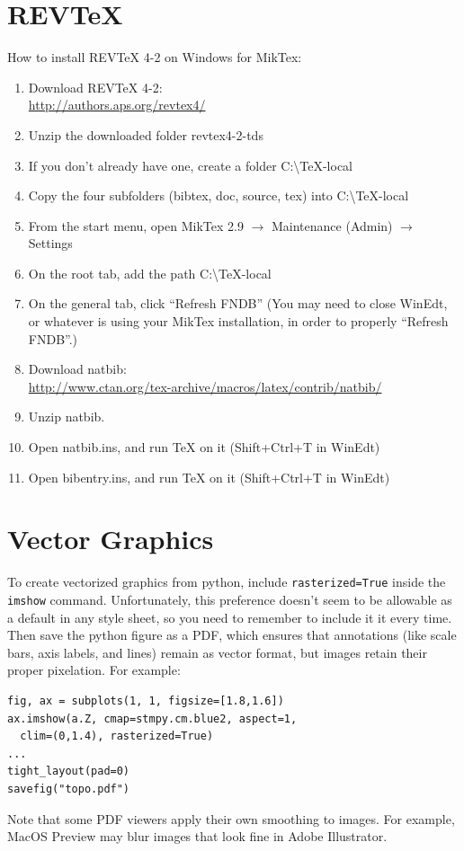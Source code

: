 \documentclass[aps,prb,twocolumn,superscriptaddress,floatfix,longbibliography]{revtex4-2}
\begin{document}
\section{\label{app:REVTeX}REVTeX}

\noindent How to install REVTeX 4-2 on Windows for MikTex:
\begin{enumerate}
\item Download REVTeX 4-2:\\ \url{http://authors.aps.org/revtex4/}
\item Unzip the downloaded folder revtex4-2-tds
\item If you don't already have one, create a folder C:\textbackslash TeX-local
\item Copy the four subfolders (bibtex, doc, source, tex) into C:\textbackslash TeX-local
\item From the start menu, open MikTex 2.9 $\rightarrow$ Maintenance (Admin) $\rightarrow$ Settings
\item On the root tab, add the path C:\textbackslash TeX-local
\item On the general tab, click ``Refresh FNDB''
(You may need to close WinEdt, or whatever is using your MikTex installation, in order to properly ``Refresh FNDB''.)
\item Download natbib:\\
\url{http://www.ctan.org/tex-archive/macros/latex/contrib/natbib/}
\item Unzip natbib.
\item Open natbib.ins, and run TeX on it (Shift+Ctrl+T in WinEdt)
\item Open bibentry.ins, and run TeX on it (Shift+Ctrl+T in WinEdt)
\end{enumerate}

\section{\label{app:vectorfig}Vector Graphics}

To create vectorized graphics from python, include {\tt rasterized=True} inside the {\tt imshow} command. Unfortunately, this preference doesn't seem to be allowable as a default in any style sheet, so you need to remember to include it it every time. Then save the python figure as a PDF, which ensures that annotations (like scale bars, axis labels, and lines) remain as vector format, but images retain their proper pixelation. For example:

\begin{verbatim}
fig, ax = subplots(1, 1, figsize=[1.8,1.6])
ax.imshow(a.Z, cmap=stmpy.cm.blue2, aspect=1,
  clim=(0,1.4), rasterized=True)
... 
tight_layout(pad=0)
savefig("topo.pdf")
\end{verbatim}

\noindent Note that some PDF viewers apply their own smoothing to images. For example, MacOS Preview may blur images that look fine in Adobe Illustrator.


\end{document}
